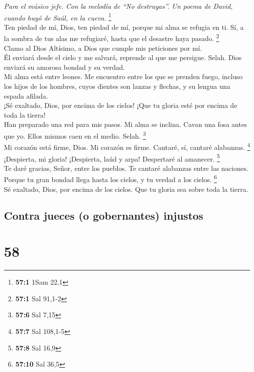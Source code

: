 \emph{Para el músico jefe. Con la melodía de ``No destruyas''. Un poema
de David, cuando huyó de Saúl, en la cueva.} \footnote{\textbf{57:1}
  1Sam 22,1}\\
 Ten piedad de mí, Dios, ten piedad de mí, porque mi alma
se refugia en ti. Sí, a la sombra de tus alas me refugiaré, hasta que el
desastre haya pasado. \footnote{\textbf{57:1} Sal 91,1-2}\\
 Clamo al Dios Altísimo, a Dios que cumple mis peticiones
por mí.\\
 Él enviará desde el cielo y me salvará, reprende al que
me persigue. Selah. Dios enviará su amorosa bondad y su verdad.\\
 Mi alma está entre leones. Me encuentro entre los que se
prenden fuego, incluso los hijos de los hombres, cuyos dientes son
lanzas y flechas, y su lengua una espada afilada.\\
 ¡Sé exaltado, Dios, por encima de los cielos! ¡Que tu
gloria esté por encima de toda la tierra!\\
 Han preparado una red para mis pasos. Mi alma se inclina.
Cavan una fosa antes que yo. Ellos mismos caen en el medio. Selah.
\footnote{\textbf{57:6} Sal 7,15}\\
 Mi corazón está firme, Dios. Mi corazón es firme.
Cantaré, sí, cantaré alabanzas. \footnote{\textbf{57:7} Sal 108,1-5}\\
 ¡Despierta, mi gloria! ¡Despierta, laúd y arpa!
Despertaré al amanecer. \footnote{\textbf{57:8} Sal 16,9}\\
 Te daré gracias, Señor, entre los pueblos. Te cantaré
alabanzas entre las naciones.\\
 Porque tu gran bondad llega hasta los cielos, y tu
verdad a los cielos. \footnote{\textbf{57:10} Sal 36,5}\\
 Sé exaltado, Dios, por encima de los cielos. Que tu
gloria sea sobre toda la tierra.

\hypertarget{contra-jueces-o-gobernantes-injustos}{%
\subsection{Contra jueces (o gobernantes)
injustos}\label{contra-jueces-o-gobernantes-injustos}}

\hypertarget{section-56}{%
\section{58}\label{section-56}}

